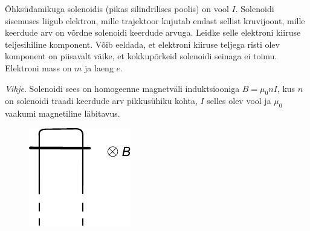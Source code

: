 \documentclass[10pt, twoside]{article}
\begin{document}
{%

Õhksüdamikuga solenoidis (pikas silindrilises poolis) on vool
$I$. Solenoidi sisemuses liigub elektron, mille trajektoor kujutab endast sellist
kruvijoont, mille keerdude arv on võrdne solenoidi keerdude arvuga. Leidke
selle elektroni kiiruse teljesihiline komponent. Võib eeldada, et elektroni kiiruse teljega risti olev komponent on piisavalt väike, et kokkupõrkeid solenoidi
seinaga ei toimu. Elektroni mass on $m$ ja laeng $e$.

\emph{Vihje}. Solenoidi sees on
homogeenne magnetväli induktsiooniga $B = \mu_0nI$, kus $n$ on solenoidi traadi
keerdude arv pikkusühiku kohta, $I$ selles olev vool ja $\mu_0$ vaakumi magnetiline
läbitavus.
\probend
\bigskip


\begin{figure}
	\vspace{-20pt}	
	\begin{center}
		\includegraphics[width=0.9\linewidth]{2011-v2g-08-yl}
	\end{center}
	\vspace{-20pt}
\end{figure}

}
\end{document}
